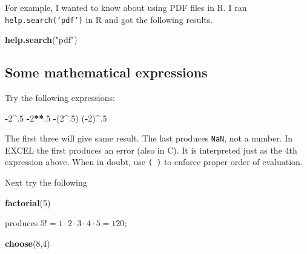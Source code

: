 \documentclass[]{book}
\newenvironment{Shaded}{\begin{snugshade}}{\end{snugshade}}
\newcommand{\KeywordTok}[1]{\textcolor[rgb]{0.13,0.29,0.53}{\textbf{#1}}}
\newcommand{\DecValTok}[1]{\textcolor[rgb]{0.00,0.00,0.81}{#1}}
\newcommand{\StringTok}[1]{\textcolor[rgb]{0.31,0.60,0.02}{#1}}
\newcommand{\OperatorTok}[1]{\textcolor[rgb]{0.81,0.36,0.00}{\textbf{#1}}}
\newcommand{\NormalTok}[1]{#1}
\begin{document}
For example, I wanted to know about using PDF files in R. I ran
\texttt{help.search(‘pdf’)} in R and got the following results.

\begin{Shaded}
\begin{Highlighting}[]
\KeywordTok{help.search}\NormalTok{(}\StringTok{"pdf"}\NormalTok{)}
\end{Highlighting}
\end{Shaded}

\subsection{Some mathematical
expressions}\label{some-mathematical-expressions}

Try the following expressions:

\begin{Shaded}
\begin{Highlighting}[]
\OperatorTok{-}\DecValTok{2}\OperatorTok{^}\NormalTok{.}\DecValTok{5}
\OperatorTok{-}\DecValTok{2}\OperatorTok{**}\NormalTok{.}\DecValTok{5}
\OperatorTok{-}\NormalTok{(}\DecValTok{2}\OperatorTok{^}\NormalTok{.}\DecValTok{5}\NormalTok{)}
\NormalTok{(}\OperatorTok{-}\DecValTok{2}\NormalTok{)}\OperatorTok{^}\NormalTok{.}\DecValTok{5}
\end{Highlighting}
\end{Shaded}

The first three will give same result. The last produces \texttt{NaN},
not a number. In EXCEL the first produces an error (also in C). It is
interpreted just as the 4th expression above. When in doubt, use
\texttt{(\ )} to enforce proper order of evaluation.

Next try the following

\begin{Shaded}
\begin{Highlighting}[]
\KeywordTok{factorial}\NormalTok{(}\DecValTok{5}\NormalTok{)}
\end{Highlighting}
\end{Shaded}

produces \(5! = 1 \cdot 2 \cdot 3 \cdot 4 \cdot 5 = 120\);

\begin{Shaded}
\begin{Highlighting}[]
\KeywordTok{choose}\NormalTok{(}\DecValTok{8}\NormalTok{,}\DecValTok{4}\NormalTok{)}
\end{Highlighting}
\end{Shaded}
\end{document}
